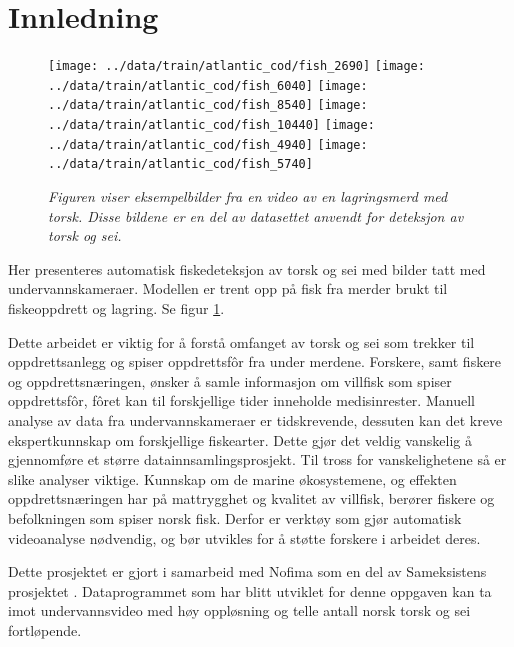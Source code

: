 \section{Innledning}




\begin{figure}[h!]
\begin{center} 
\texttt{[image: ../data/train/atlantic\_cod/fish\_2690]}
\texttt{[image: ../data/train/atlantic\_cod/fish\_6040]}
\texttt{[image: ../data/train/atlantic\_cod/fish\_8540]}
\texttt{[image: ../data/train/atlantic\_cod/fish\_10440]}
\texttt{[image: ../data/train/atlantic\_cod/fish\_4940]}
\texttt{[image: ../data/train/atlantic\_cod/fish\_5740]}
\caption{\small \sl Figuren viser eksempelbilder fra en video av en lagringsmerd med torsk. Disse bildene er en del av datasettet anvendt for deteksjon av torsk og sei. \label{fig:data}} 
\end{center} 
\end{figure} 

Her presenteres automatisk fiskedeteksjon av torsk og sei med bilder tatt med undervannskameraer. Modellen er trent opp på fisk fra merder brukt til fiskeoppdrett og lagring. Se figur \ref{fig:data}.

Dette arbeidet er viktig for å forstå omfanget av torsk og sei som trekker til oppdrettsanlegg og spiser oppdrettsfôr fra under merdene. Forskere, samt fiskere og oppdrettsnæringen, ønsker å samle informasjon om villfisk som spiser oppdrettsfôr, fôret kan til forskjellige tider inneholde medisinrester. Manuell analyse av data fra undervannskameraer er tidskrevende, dessuten kan det kreve ekspertkunnskap om forskjellige fiskearter. Dette gjør det veldig vanskelig å gjennomføre et større datainnsamlingsprosjekt. Til tross for vanskelighetene så er slike analyser viktige. Kunnskap om de marine økosystemene, og effekten oppdrettsnæringen har på mattrygghet og kvalitet av villfisk, berører fiskere og befolkningen som spiser norsk fisk. Derfor er verktøy som gjør automatisk videoanalyse nødvendig, og bør utvikles for å støtte forskere i arbeidet deres.

Dette prosjektet er gjort i samarbeid med Nofima som en del av Sameksistens prosjektet \cite{Robertsen 2020}. Dataprogrammet som har blitt utviklet for denne oppgaven kan ta imot undervannsvideo med høy oppløsning og telle antall norsk torsk og sei fortløpende.


